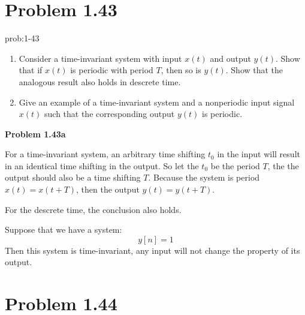 \documentclass[koma,a4paper,utopia,12pt,listings-color,microtype,paralist,colorlinks,urlcolor=red]{org-article}
\begin{document}
\section{Problem 1.43}
\label{sec:org51636a9}


\begin{prob}[]{prob:1-43}
\begin{enumerate}
\item Consider a time-invariant system with input \(x(t)\) and output \(y(t)\).
Show that if \(x(t)\) is periodic with period \(T\), then so is \(y(t)\).
Show that the analogous result also holds in descrete time.
\item Give an example of a time-invariant system and a nonperiodic input signal
\(x(t)\) such that the corresponding output \(y(t)\) is periodic.
\end{enumerate}
\label{prob:1-43}
\end{prob}

\textbf{Problem 1.43a}

For a time-invariant system, an arbitrary time shifting \(t_{0}\) in the input
will result in an identical time shifting in the output. So let the \(t_{0}\) be
the period \(T\), the the output should also be a time shifting \(T\). Because
the system is period \(x(t) = x(t+T)\), then the output \(y(t) = y(t+T)\).

For the descrete time, the conclusion also holds.

Suppose that we have a system:
\begin{equation*}
y[n] = 1
\end{equation*}
Then this system is time-invariant, any input will not change the property of
its output.
\section{Problem 1.44}
\label{sec:org159eee9}
\end{document}
